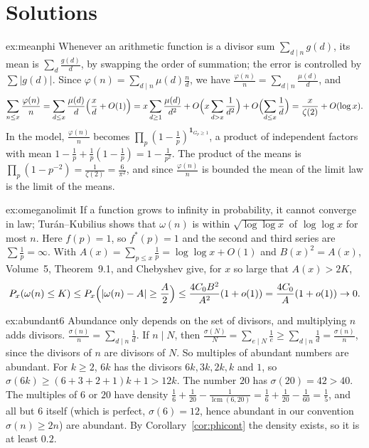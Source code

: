\section{Solutions}

\begin{solution}{ex:meanphi}
\idea Whenever an arithmetic function is a divisor sum $\sum_{d\mid n}g(d)$, its mean is $\sum_d\frac{g(d)}d$, by swapping the order of summation; the error is controlled by $\sum|g(d)|$.
\writeup Since $\varphi(n)=\sum_{d\mid n}\mu(d)\frac nd$, we have $\frac{\varphi(n)}n=\sum_{d\mid n}\frac{\mu(d)}d$, and
\[
\sum_{n\le x}\frac{\varphi(n)}n=\sum_{d\le x}\frac{\mu(d)}d\Bigl(\frac xd+O(1)\Bigr)=x\sum_{d\ge1}\frac{\mu(d)}{d^2}+O\Bigl(x\sum_{d>x}\frac1{d^2}\Bigr)+O\Bigl(\sum_{d\le x}\frac1d\Bigr)=\frac x{\zeta(2)}+O(\log x).
\]
In the model, $\frac{\varphi(n)}n$ becomes $\prod_p(1-\frac1p)^{\mathbf 1_{G_p\ge1}}$, a product of independent factors with mean $1-\frac1p+\frac1p(1-\frac1p)=1-\frac1{p^2}$. The product of the means is $\prod_p(1-p^{-2})=\frac1{\zeta(2)}=\frac6{\pi^2}$, and since $\frac{\varphi(n)}n$ is bounded the mean of the limit law is the limit of the means.
\end{solution}

\begin{solution}{ex:omeganolimit}
\idea If a function grows to infinity in probability, it cannot converge in law; Tur\'an--Kubilius shows that $\omega(n)$ is within $\sqrt{\log\log x}$ of $\log\log x$ for most $n$.
\writeup Here $f(p)=1$, so $f^*(p)=1$ and the second and third series are $\sum\frac1p=\infty$. With $A(x)=\sum_{p\le x}\frac1p=\log\log x+O(1)$ and $B(x)^2=A(x)$, Volume~5, Theorem~9.1, and Chebyshev give, for $x$ so large that $A(x)>2K$,
\[
P_x(\omega(n)\le K)\le P_x\Bigl(|\omega(n)-A|\ge\frac A2\Bigr)\le\frac{4C_0B^2}{A^2}(1+o(1))=\frac{4C_0}{A}(1+o(1))\to0.
\]
\end{solution}

\begin{solution}{ex:abundant6}
\idea Abundance only depends on the set of divisors, and multiplying $n$ adds divisors.
\writeup $\frac{\sigma(n)}n=\sum_{d\mid n}\frac1d$. If $n\mid N$, then $\frac{\sigma(N)}N=\sum_{e\mid N}\frac1e\ge\sum_{d\mid n}\frac1d=\frac{\sigma(n)}n$, since the divisors of $n$ are divisors of $N$. So multiples of abundant numbers are abundant. For $k\ge2$, $6k$ has the divisors $6k,3k,2k,k$ and $1$, so $\sigma(6k)\ge(6+3+2+1)k+1>12k$. The number $20$ has $\sigma(20)=42>40$. The multiples of $6$ or $20$ have density $\frac16+\frac1{20}-\frac1{\operatorname{lcm}(6,20)}=\frac16+\frac1{20}-\frac1{60}=\frac15$, and all but $6$ itself (which is perfect, $\sigma(6)=12$, hence abundant in our convention $\sigma(n)\ge2n$) are abundant. By Corollary~\ref{cor:phicont} the density exists, so it is at least $0.2$.
\end{solution}

